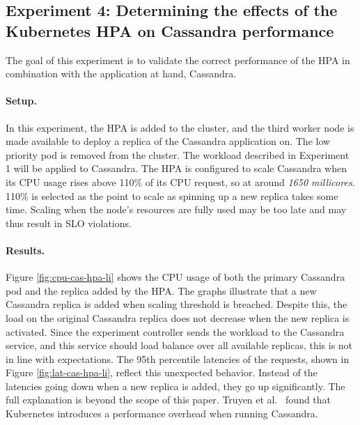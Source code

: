 \subsection{Experiment 4: Determining the effects of the Kubernetes HPA on Cassandra performance}
\label{exp:hpa-cass}
The goal of this experiment is to validate the correct performance of the HPA in combination with the application at hand, Cassandra. 

\paragraph{Setup.}
In this experiment, the HPA is added to the cluster, and the third worker node is made available to deploy a replica of the Cassandra application on. The low priority pod is removed from the cluster. The workload described in Experiment 1 will be applied to Cassandra. The HPA is configured to scale Cassandra when its CPU usage rises above 110\% of its CPU request, so at around \textit{1650 millicores}. 110\% is selected as the point to scale as spinning up a new replica takes some time. Scaling when the node's resources are fully used may be too late and may thus result in SLO violations. %

\paragraph{Results.}
Figure \ref{fig:cpu-cas-hpa-li} shows the CPU usage of both the primary Cassandra pod and the replica added by the HPA. The graphs illustrate that a new Cassandra replica is added when scaling threshold is breached. Despite this, the load on the original Cassandra replica does not decrease when the new replica is activated. Since the experiment controller sends the workload to the Cassandra service, and this service should load balance over all available replicas, this is not in line with expectations. The 95th percentile latencies of the requests, shown in Figure \ref{fig:lat-cas-hpa-li}, reflect this unexpected behavior. Instead of the latencies going down when a new replica is added, they go up significantly.
The full explanation is beyond the scope of this paper. Truyen et al.~\citep{TruyenEddy2019Pooc} found that Kubernetes introduces a performance overhead when running Cassandra. %

